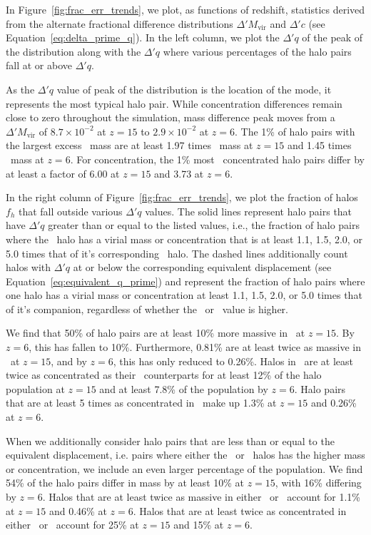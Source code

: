 In Figure~\ref{fig:frac_err_trends}, we plot, as functions of redshift, statistics derived from the alternate fractional difference distributions $\Delta' M_{\mathrm{vir}}$ and $\Delta' c$ (see Equation~\ref{eq:delta_prime_q}).  In the left column, we plot the $\Delta' q$ of the peak of the distribution along with the $\Delta' q$ where various percentages of the halo pairs fall at or above $\Delta' q$.

As the $\Delta' q$ value of peak of the distribution is the location of the mode, it represents the most typical halo pair.  While concentration differences remain close to zero throughout the simulation, mass difference peak moves from a $\Delta' M_{\mathrm{vir}}$ of $8.7 \times 10^{-2}$ at $z = 15$ to $2.9 \times 10^{-2}$ at $z = 6$.  The 1\% of halo pairs with the largest excess \lpt\ mass are at least 1.97 times \za\ mass at $z = 15$ and 1.45 times \za\ mass at $z = 6$.  For concentration, the 1\% most \lpt\ concentrated halo pairs differ by at least a factor of 6.00 at $z = 15$ and 3.73 at $z = 6$.

In the right column of Figure~\ref{fig:frac_err_trends}, we plot the fraction of halos $f_{h}$ that fall outside various $\Delta' q$ values.  The solid lines represent halo pairs that have $\Delta' q$ greater than or equal to the listed values, i.e., the fraction of halo pairs where the \lpt\ halo has a virial mass or concentration that is at least 1.1, 1.5, 2.0, or 5.0 times that of it's corresponding \za\ halo.  The dashed lines additionally count halos with $\Delta' q$ at or below the corresponding equivalent displacement (see Equation~\ref{eq:equivalent_q_prime}) and represent the fraction of halo pairs where one halo has a virial mass or concentration at least 1.1, 1.5, 2.0, or 5.0 times that of it's companion, regardless of whether the \lpt\ or \za\ value is higher.

We find that 50\% of halo pairs are at least 10\% more massive in \lpt\ at $z = 15$.  By $z = 6$, this has fallen to 10\%.  Furthermore, 0.81\% are at least twice as massive in \lpt\ at $z = 15$, and by $z = 6$, this has only reduced to 0.26\%.  Halos in \lpt\ are at least twice as concentrated as their \za\ counterparts for at least 12\% of the halo population at $z = 15$ and at least 7.8\% of the population by $z = 6$.  Halo pairs that are at least 5 times as concentrated in \lpt\ make up 1.3\% at $z = 15$ and 0.26\% at $z = 6$.

When we additionally consider halo pairs that are less than or equal to the equivalent displacement, i.e. pairs where either the \lpt\ or \za\ halos has the higher mass or concentration, we include an even larger percentage of the population.  We find 54\% of the halo pairs differ in mass by at least 10\% at $z = 15$, with 16\% differing by $z = 6$.  Halos that are at least twice as massive in either \lpt\ or \za\ account for 1.1\% at $z = 15$ and 0.46\% at $z = 6$.  Halos that are at least twice as concentrated in either \lpt\ or \za\ account for 25\% at $z = 15$ and 15\% at $z = 6$.




